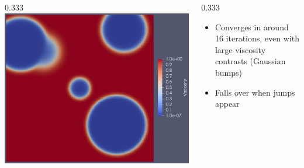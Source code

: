 \documentclass[presentation,aspectratio=43, 10pt]{beamer}
\begin{document}
\begin{frame}[fragile, t]
\begin{overlayarea}{\textwidth}{0.52\textheight}
\begin{onlyenv}
\begin{columns}
\begin{column}{0.333\pagewidth}
        \includegraphics[width=\textwidth]{stokes-viscosity}
      \end{column}
      \begin{column}{0.333\pagewidth}
        \begin{itemize}
        \item Converges in around 16 iterations, even with large
          viscosity contrasts (Gaussian bumps)
        \item Falls over when jumps appear
        \end{itemize}
      \end{column}
    \end{columns}
  \end{onlyenv}
  \end{overlayarea}
\end{frame}
\end{document}
